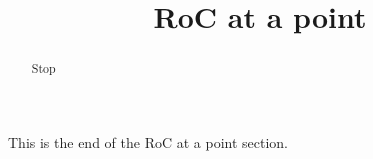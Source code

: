 \documentclass[handout]{ximera}
\title{RoC at a point}
\begin{document}
\begin{abstract} Stop
\end{abstract}

\maketitle

This is the end of the RoC at a point section.
\end{document}
